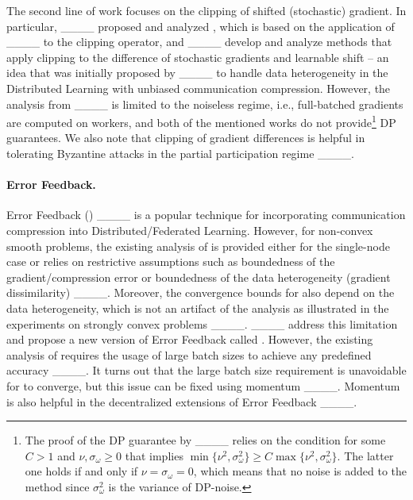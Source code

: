 The second line of work focuses on the clipping of shifted (stochastic) gradient. In particular, ____ proposed and analyzed , which is based on the application of  ____ to the clipping operator, and ____ develop and analyze methods that apply clipping to the difference of stochastic gradients and learnable shift -- an idea that was initially proposed by ____ to handle data heterogeneity in the Distributed Learning with unbiased communication compression. However, the analysis from ____ is limited to the noiseless regime, i.e., full-batched gradients are computed on workers, and both of the mentioned works do not provide\footnote{The proof of the DP guarantee by ____ relies on the condition for some $C > 1$ and $\nu, \sigma_\omega \geq 0$ that implies $\min\{\nu^2, \sigma_\omega^2\} \geq C \max\{\nu^2, \sigma_\omega^2\}$. The latter one holds if and only if $\nu = \sigma_\omega = 0$, which means that no noise is added to the method since $\sigma_\omega^2$ is the variance of DP-noise.} DP guarantees. We also note that clipping of gradient differences is helpful in tolerating Byzantine attacks in the partial participation regime ____.



\paragraph{Error Feedback.} Error Feedback () ____ is a popular technique for incorporating communication compression into Distributed/Federated Learning. However, for non-convex smooth problems, the existing analysis of  is provided either for the single-node case or relies on restrictive assumptions such as boundedness of the gradient/compression error or boundedness of the data heterogeneity (gradient dissimilarity) ____. Moreover, the convergence bounds for  also depend on the data heterogeneity, which is not an artifact of the analysis as illustrated in the experiments on strongly convex problems ____. ____ address this limitation and propose a new version of Error Feedback called . However, the existing analysis of  requires the usage of large batch sizes to achieve any predefined accuracy ____. It turns out that the large batch size requirement is unavoidable for  to converge, but this issue can be fixed using momentum ____. Momentum is also helpful in the decentralized extensions of Error Feedback ____.